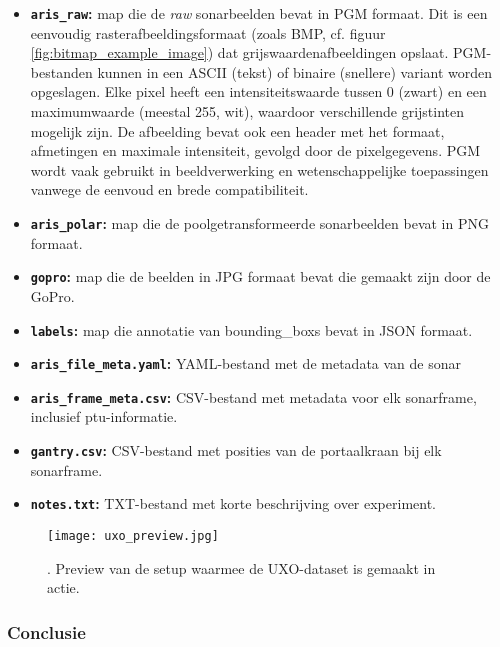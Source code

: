 \begin{itemize}
    \item \textbf{\texttt{aris\_raw}:} map die de \emph{raw} sonarbeelden bevat in PGM formaat. Dit is een eenvoudig rasterafbeeldingsformaat (zoals BMP, cf. figuur \ref{fig:bitmap_example_image}) dat grijswaardenafbeeldingen opslaat. PGM-bestanden kunnen in een ASCII (tekst) of binaire (snellere) variant worden opgeslagen. Elke pixel heeft een intensiteitswaarde tussen 0 (zwart) en een maximumwaarde (meestal 255, wit), waardoor verschillende grijstinten mogelijk zijn. De afbeelding bevat ook een header met het formaat, afmetingen en maximale intensiteit, gevolgd door de pixelgegevens. PGM wordt vaak gebruikt in beeldverwerking en wetenschappelijke toepassingen vanwege de eenvoud en brede compatibiliteit. \autocite{Poskanzer_2016}
    \item \textbf{\texttt{aris\_polar}:} map die de poolgetransformeerde sonarbeelden bevat in PNG formaat.
    \item \textbf{\texttt{gopro}:} map die de beelden in JPG formaat bevat die gemaakt zijn door de GoPro.
    \item \textbf{\texttt{labels}:} map die annotatie van \glspl{bounding_box} bevat in JSON formaat.
    \item \textbf{\texttt{aris\_file\_meta.yaml}:} YAML-bestand met de metadata van de sonar 
    \item \textbf{\texttt{aris\_frame\_meta.csv}:} CSV-bestand met metadata voor elk sonarframe, inclusief \gls{ptu}-informatie.
    \item \textbf{\texttt{gantry.csv}:} CSV-bestand met posities van de \gls{portaalkraan} bij elk sonarframe.
    \item \textbf{\texttt{notes.txt}:} TXT-bestand met korte beschrijving over experiment.
\end{itemize}

\begin{figure}[H]
    \centering
    \texttt{[image: uxo\_preview.jpg]}
    \caption[UXO-setup in actie]{\label{fig:uxo_preview}. Preview van de setup waarmee de UXO-dataset is gemaakt in actie. \autocite{Dahn_2024_UXO}}
\end{figure}

\clearpage

\subsubsection{Conclusie}


